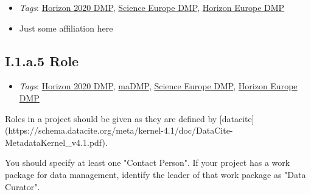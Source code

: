 \documentclass[a4paper,12pt]{report}
\begin{document}
\begin{itemize}
  \item \textit{Tags}: \ul{Horizon 2020 DMP}, \ul{Science Europe DMP}, \ul{Horizon Europe DMP}
  \end{itemize}




\begin{itemize}
  \item[\CheckmarkBold]
  \begin{markdown}
  Just some affiliation here
  \end{markdown}
  
\end{itemize}


\subsection*{\protect\textcolor{colorSecId}{I.1.a.5} Role}

\label{1e85da40-bbfc-4180-903e-6c569ed2da38.73d686bd-7939-412e-8631-502ee6d9ea7b.e8be8cc6-d323-4b94-8895-68b998582dbf.829dcda6-db8a-40ac-819a-92b9b52490f5}


\begin{itemize}
  \item \textit{Tags}: \ul{Horizon 2020 DMP}, \ul{maDMP}, \ul{Science Europe DMP}, \ul{Horizon Europe DMP}
  \end{itemize}


\noindent
\begin{markdown}
Roles in a project should be given as they are defined by [datacite](https://schema.datacite.org/meta/kernel-4.1/doc/DataCite-MetadataKernel_v4.1.pdf). 

You should specify at least one "Contact Person". If your project has a work package for data management, identify the leader of that work package as "Data Curator".
\end{markdown}
\end{document}
